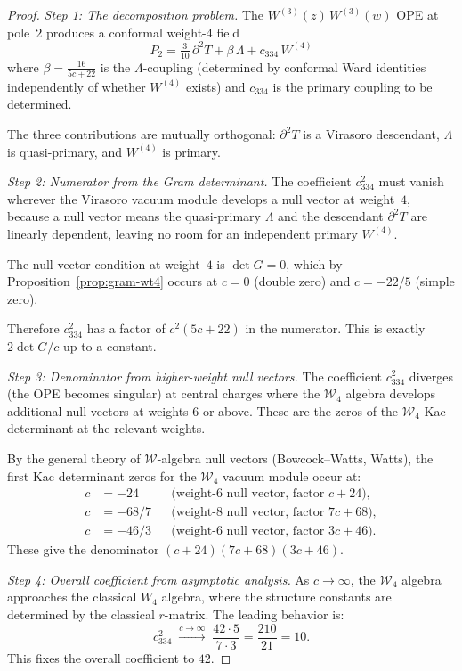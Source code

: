 \documentclass[11pt]{article}
\newcommand{\cW}{\mathcal{W}}
\begin{document}
\begin{proof}
\emph{Step 1: The decomposition problem.}
The $W^{(3)}(z)\,W^{(3)}(w)$ OPE at pole~$2$ produces a conformal
weight-$4$ field
\[
P_2 = \tfrac{3}{10}\,\partial^2 T
+ \beta\,\Lambda
+ c_{334}\,W^{(4)}
\]
where $\beta = \frac{16}{5c+22}$ is the $\Lambda$-coupling (determined
by conformal Ward identities independently of whether $W^{(4)}$ exists)
and $c_{334}$ is the primary coupling to be determined.

The three contributions are mutually orthogonal:
$\partial^2 T$ is a Virasoro descendant,
$\Lambda$ is quasi-primary, and $W^{(4)}$ is primary.

\medskip
\emph{Step 2: Numerator from the Gram determinant.}
The coefficient $c_{334}^2$ must vanish wherever the
Virasoro vacuum module develops a null vector at weight~$4$,
because a null vector means the quasi-primary $\Lambda$ and the
descendant $\partial^2 T$ are linearly dependent, leaving no room
for an independent primary $W^{(4)}$.

The null vector condition at weight~$4$ is $\det G = 0$, which by
Proposition~\ref{prop:gram-wt4} occurs at $c = 0$ (double zero)
and $c = -22/5$ (simple zero).

Therefore $c_{334}^2$ has a factor of
$c^2(5c+22)$ in the numerator.  This is exactly
$2\det G / c$ up to a constant.

\medskip
\emph{Step 3: Denominator from higher-weight null vectors.}
The coefficient $c_{334}^2$ diverges (the OPE becomes singular) at
central charges where the $\cW_4$ algebra develops additional null
vectors at weights $6$ or above.  These are the zeros of the
$\cW_4$ Kac determinant at the relevant weights.

By the general theory of $\cW$-algebra null vectors
(Bowcock--Watts, Watts), the first Kac determinant zeros for
the $\cW_4$ vacuum module occur at:
\begin{align*}
c &= -24 & &\text{(weight-$6$ null vector, factor $c+24$)}, \\
c &= -68/7 & &\text{(weight-$8$ null vector, factor $7c+68$)}, \\
c &= -46/3 & &\text{(weight-$6$ null vector, factor $3c+46$)}.
\end{align*}
These give the denominator $(c+24)(7c+68)(3c+46)$.

\medskip
\emph{Step 4: Overall coefficient from asymptotic analysis.}
As $c \to \infty$, the $\cW_4$ algebra approaches the classical
$W_4$ algebra, where the structure constants are determined by the
classical $r$-matrix.  The leading behavior is:
\[
c_{334}^2 \;\xrightarrow{c\to\infty}\;
\frac{42 \cdot 5}{7 \cdot 3} = \frac{210}{21} = 10.
\]
This fixes the overall coefficient to $42$.


\end{proof}
\end{document}
